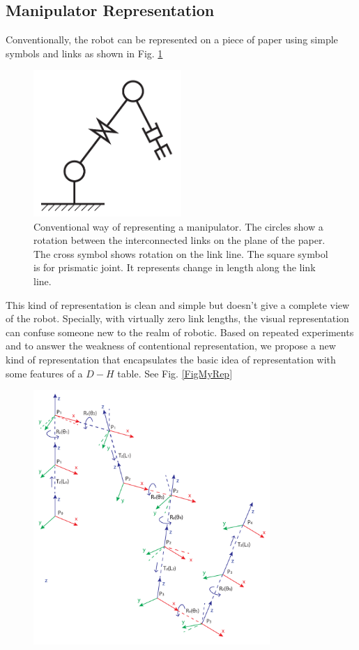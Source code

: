 {    \subsection{Manipulator Representation}
    {
        Conventionally, the robot can be represented on a piece of paper using simple symbols and links as shown in Fig. \ref{FigConventionalRep}
        \begin{figure}[hb]
          \centering
          \includegraphics[width=0.5\textwidth]{RobotRep1.pdf}
          \caption{Conventional way of representing a manipulator. The circles show a rotation between the interconnected links on the plane of the paper. The cross symbol shows rotation on the link line. The square symbol is for prismatic joint. It represents change in length along the link line.}\label{FigConventionalRep}
        \end{figure}
        This kind of representation is clean and simple but doesn't give a complete view of the robot. Specially, with virtually zero link lengths, the visual representation can confuse someone new to the realm of robotic. Based on repeated experiments and to answer the weakness of contentional representation, we propose a new kind of representation that encapsulates the basic idea of representation with some features of a $D-H$ table. See Fig. \ref{FigMyRep}
        \begin{figure}
          \centering
          \includegraphics[width=0.8\textwidth]{MyRep.pdf}

\end{figure}}}

